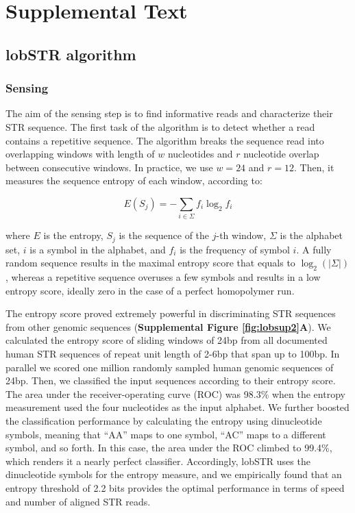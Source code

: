 {\section{Supplemental Text}
\label{sec:lobsupptext}
\subsection{lobSTR algorithm}

\subsubsection{Sensing}
The aim of the sensing step is to find informative reads and characterize their STR sequence. The first task of the algorithm is to detect whether a read contains a repetitive sequence. The algorithm breaks the sequence read into overlapping windows with length of $w$ nucleotides and $r$ nucleotide overlap between consecutive windows. In practice, we use $w=24$ and $r=12$. Then, it measures the sequence entropy of each window, according to:

\begin{equation}
E(S_j) = -\sum_{i \in \Sigma}f_i \log_2 f_i
\end{equation}

where $E$ is the entropy, $S_j$ is the sequence of the $j$-th window, $\Sigma$ is the alphabet set, $i$ is a symbol in the alphabet, and $f_i$ is the frequency of symbol $i$. A fully random sequence results in the maximal entropy score that equals to $\log_2(|\Sigma|)$, whereas a repetitive sequence overuses a few symbols and results in a low entropy score, ideally zero in the case of a perfect homopolymer run.

The entropy score proved extremely powerful in discriminating STR sequences from other genomic sequences (\textbf{Supplemental Figure \ref{fig:lobsup2}A}). We calculated the entropy score of sliding windows of 24bp from all documented human STR sequences of repeat unit length of 2-6bp that span up to 100bp. In parallel we scored one million randomly sampled human genomic sequences of 24bp. Then, we classified the input sequences according to their entropy score. The area under the receiver-operating curve (ROC) was 98.3\% when the entropy measurement used the four nucleotides as the input alphabet. We further boosted the classification performance by calculating the entropy using dinucleotide symbols, meaning that “AA” maps to one symbol, “AC” maps to a different symbol, and so forth. In this case, the area under the ROC climbed to 99.4\%, which renders it a nearly perfect classifier. Accordingly, lobSTR uses the dinucleotide symbols for the entropy measure, and we empirically found that an entropy threshold of 2.2 bits provides the optimal performance in terms of speed and number of aligned STR reads.

}
